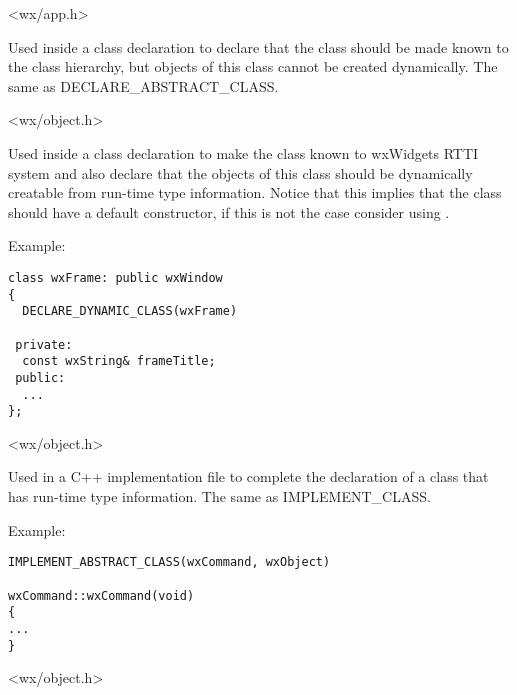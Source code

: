 
<wx/app.h>


\label{declareclass}


Used inside a class declaration to declare that the class should be
made known to the class hierarchy, but objects of this class cannot be created
dynamically. The same as DECLARE\_ABSTRACT\_CLASS.


<wx/object.h>


\label{declaredynamicclass}


Used inside a class declaration to make the class known to wxWidgets RTTI
system and also declare that the objects of this class should be dynamically
creatable from run-time type information. Notice that this implies that the
class should have a default constructor, if this is not the case consider using
.

Example:

\begin{verbatim}
class wxFrame: public wxWindow
{
  DECLARE_DYNAMIC_CLASS(wxFrame)

 private:
  const wxString& frameTitle;
 public:
  ...
};
\end{verbatim}


<wx/object.h>


\label{implementabstractclass}


Used in a C++ implementation file to complete the declaration of
a class that has run-time type information. The same as IMPLEMENT\_CLASS.

Example:

\begin{verbatim}
IMPLEMENT_ABSTRACT_CLASS(wxCommand, wxObject)

wxCommand::wxCommand(void)
{
...
}
\end{verbatim}


<wx/object.h>


\label{implementabstractclass2}


